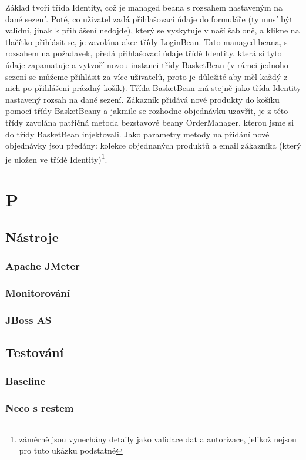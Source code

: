 \documentclass[122pt,oneside]{fithesis}
\begin{document}
Základ tvoří třída Identity, což je managed beana s rozsahem nastaveným na dané sezení. Poté, co uživatel zadá přihlašovací údaje do formuláře (ty musí být validní, jinak k přihlášení nedojde), který se vyskytuje v naší šabloně, a klikne na tlačítko přihlásit se, je zavolána akce třídy LoginBean. Tato managed beana, s rozsahem na požadavek, předá přihlašovací údaje třídě Identity, která si tyto údaje zapamatuje a vytvoří novou instanci třídy BasketBean (v rámci jednoho sezení se můžeme přihlásit za více uživatelů, proto je důležité aby měl každý z nich po přihlášení prázdný košík). Třída BasketBean má stejně jako třída Identity nastavený rozsah na dané sezení. Zákazník přidává nové produkty do košíku pomocí třídy BasketBeany a jakmile se rozhodne objednávku uzavřít, je z této třídy zavolána patřičná metoda bezstavové beany OrderManager, kterou jsme si do třídy BasketBean injektovali. Jako parametry metody na přidání nové objednávky jsou předány: kolekce objednaných produktů a email zákazníka (který je uložen ve třídě Identity)\footnote[1]{záměrně jsou vynechány detaily jako validace dat a autorizace, jelikož nejsou pro tuto ukázku podstatné}.

\chapter{P}
\section{Nástroje}
\subsection{Apache JMeter}
\subsection{Monitorování}
\subsection{JBoss AS}
\section{Testování}
\subsection{Baseline}
\subsection{Neco s restem}
\end{document}

